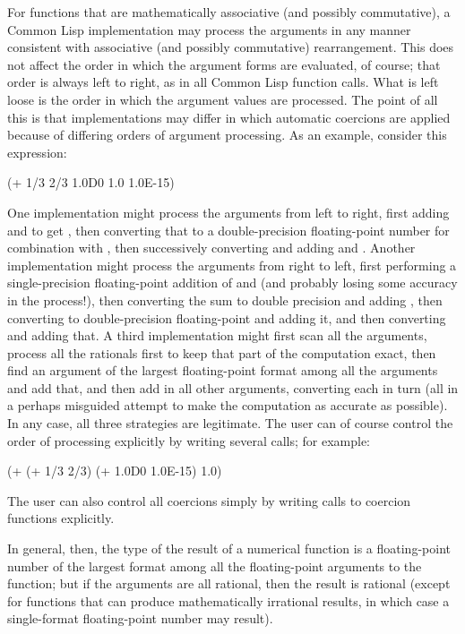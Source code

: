 For functions that are mathematically associative (and possibly commutative),
a Common Lisp implementation may process the arguments in any manner consistent
with associative (and possibly commutative) rearrangement.
This does not affect the order in which the argument forms
are evaluated, of course; that order is always left to right,
as in all Common Lisp function calls.  What is left loose is the
order in which the argument values are processed.
The point of all this is that implementations may differ in 
which automatic coercions are applied because of differing
orders of argument processing.  As an example, consider this
expression:
\begin{lisp}
(+ 1/3 2/3 1.0D0 1.0 1.0E-15)
\end{lisp}
One implementation might process the arguments from left to right,
first adding  and  to get , then converting that
to a double-precision floating-point number for combination
with , then successively converting and adding  and
.  Another implementation might process the arguments
from right to left, first performing a single-precision floating-point addition
of  and  (and probably losing some accuracy
in the process!), then converting the sum to double precision
and adding , then converting  to double-precision
floating-point and adding it, and then converting  and adding that.
A third implementation might first scan all the arguments, process
all the rationals first to keep that part of the computation exact,
then find an argument of the largest floating-point format among all
the arguments and add that, and then add in all other arguments,
converting each in turn (all in a perhaps misguided attempt to make
the computation as accurate as possible).  In any case, all three
strategies are legitimate.  The user can of course control the order of
processing explicitly by writing several calls; for example:
\begin{lisp}
(+ (+ 1/3 2/3) (+ 1.0D0 1.0E-15) 1.0)
\end{lisp}
The user can also control all coercions simply by writing calls
to coercion functions explicitly.

In general, then, the type of the result of a numerical function
is a floating-point number of the largest format among all the
floating-point arguments to the function; but if the arguments
are all rational, then the result is rational (except for functions
that can produce mathematically irrational results, in which case
a single-format floating-point number may result).

